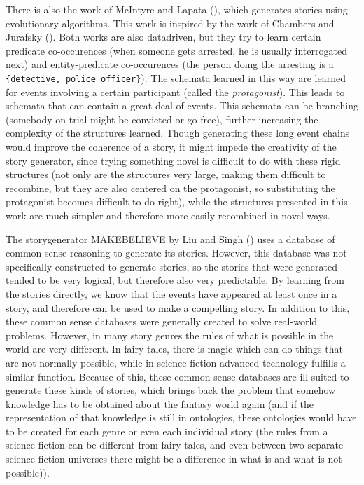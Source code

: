 There is also the work of McIntyre and Lapata (\cite{McIntyre2010}), which
generates stories using evolutionary algorithms. This work is inspired by the
work of Chambers and Jurafsky (\cite{chambers2009unsupervised}). Both works are
also datadriven, but they try to learn certain predicate co-occurences (when someone
gets arrested, he is usually interrogated next) and entity-predicate
co-occurences (the person doing the arresting is a \texttt{\{detective, police
officer\}}). The schemata learned in this way are learned for events involving a
certain participant (called the \emph{protagonist}). This leads to schemata that
can contain a great deal of events. This schemata can be branching (somebody on trial
might be convicted or go free), further increasing the complexity of the
structures learned.
Though generating these long event chains would improve the coherence of a story, 
it might impede the creativity of the story generator, since trying something novel is
difficult to do with these rigid structures (not only are the structures very
large, making them difficult to recombine, but they are also centered on the
protagonist, so substituting the protagonist becomes difficult to do right), while the structures presented in
this work are much simpler and therefore more easily recombined in novel ways.

The storygenerator MAKEBELIEVE by Liu and Singh (\cite{liu2002makebelieve}) uses
a database of common sense reasoning to generate its stories. However, this
database was not specifically constructed to generate stories, so the stories
that were generated tended to be very logical, but therefore also very
predictable. By
learning from the stories directly, we know that the events have appeared at
least once in a story, and therefore can be used to make a compelling story.
In addition to this, these common sense databases were generally created to
solve real-world problems. However, in many story genres
the rules of what is possible in the world are very different. In fairy tales,
there is magic which can do things that are not normally possible, while in science fiction
advanced technology fulfills a similar function. Because of this, these common sense
databases are ill-suited to generate these kinds of stories, which brings back
the problem that somehow knowledge has to be obtained about the fantasy
world again (and if the representation of that knowledge is still in ontologies,
these ontologies would have to be created for each genre or even each individual
story (the rules from a science fiction can be different from fairy tales, and
even between two separate science fiction universes there might be a difference
in what is and what is not possible)).

